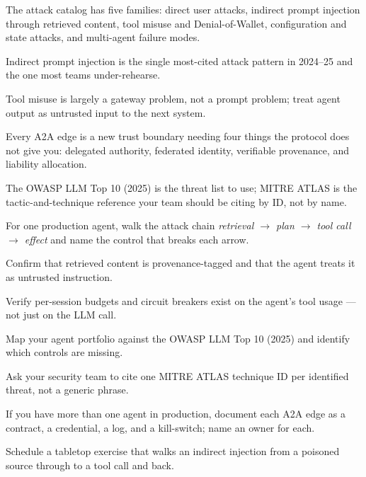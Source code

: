 \begin{TNkeytakeaways}
\item The attack catalog has five families: direct user attacks, indirect prompt injection through retrieved content, tool misuse and Denial-of-Wallet, configuration and state attacks, and multi-agent failure modes.
\item Indirect prompt injection \citep{greshake2023promptinj} is the single most-cited attack pattern in 2024--25 and the one most teams under-rehearse.
\item Tool misuse is largely a gateway problem, not a prompt problem; treat agent output as untrusted input to the next system.
\item Every A2A edge is a new trust boundary needing four things the protocol does not give you: delegated authority, federated identity, verifiable provenance, and liability allocation.
\item The OWASP LLM Top 10 (2025) is the threat list to use; MITRE ATLAS is the tactic-and-technique reference your team should be citing by ID, not by name.
\end{TNkeytakeaways}

\begin{TNchecklist}
\item For one production agent, walk the attack chain \textit{retrieval $\rightarrow$ plan $\rightarrow$ tool call $\rightarrow$ effect} and name the control that breaks each arrow.
\item Confirm that retrieved content is provenance-tagged and that the agent treats it as untrusted instruction.
\item Verify per-session budgets and circuit breakers exist on the agent's tool usage --- not just on the LLM call.
\item Map your agent portfolio against the OWASP LLM Top 10 (2025) and identify which controls are missing.
\item Ask your security team to cite one MITRE ATLAS technique ID per identified threat, not a generic phrase.
\item If you have more than one agent in production, document each A2A edge as a contract, a credential, a log, and a kill-switch; name an owner for each.
\item Schedule a tabletop exercise that walks an indirect injection from a poisoned source through to a tool call and back.
\end{TNchecklist}


